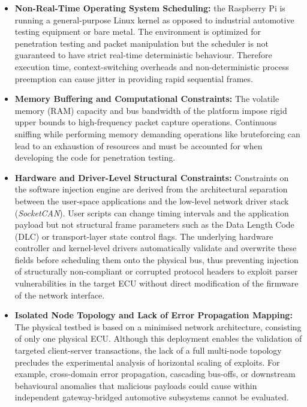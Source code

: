 \begin{itemize}
    \item \textbf{Non-Real-Time Operating System Scheduling:} the Raspberry Pi is running a general-purpose Linux kernel as opposed to industrial automotive testing equipment or bare metal. The environment is optimized for penetration testing and packet manipulation but the scheduler is not guaranteed to  have strict real-time deterministic behaviour. Therefore execution time, context-switching overheads and non-deterministic process preemption can cause jitter in providing rapid sequential frames.
    \item \textbf{Memory Buffering and Computational Constraints:} The volatile memory (\gls{RAM}) capacity and bus bandwidth of the platform impose rigid upper bounds to high-frequency packet capture operations. Continuous sniffing while performing memory demanding operations like bruteforcing can lead to an exhaustion of resources and must be accounted for when developing the code for penetration testing.
    \item \textbf{Hardware and Driver-Level Structural Constraints:} Constraints on the software injection engine are derived from the architectural separation between the user-space applications and the low-level network driver stack (\textit{SocketCAN}). User scripts can change timing intervals and the application payload but not structural frame parameters such as the Data Length Code (\gls{DLC}) or transport-layer state control flags. The underlying hardware controller and kernel-level drivers automatically validate and overwrite these fields before scheduling them onto the physical bus, thus preventing injection of structurally non-compliant or corrupted protocol headers to exploit parser vulnerabilities in the target \gls{ECU} without direct modification of the firmware of the network interface.
   \item \textbf{Isolated Node Topology and Lack of Error Propagation Mapping:} The physical testbed is based on a minimised network architecture, consisting of only one physical \gls{ECU}. Although this deployment enables the validation of targeted client-server transactions, the lack of a full multi-node topology precludes the experimental analysis of horizontal scaling of exploits. For example, cross-domain error propagation, cascading bus-offs, or downstream behavioural anomalies that malicious payloads could cause within independent gateway-bridged automotive subsystems cannot be evaluated. 
\end{itemize}